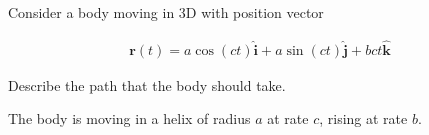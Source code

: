 Consider a body moving in 3D with position vector

\begin{align*}
    \boldsymbol{r}(t) = a\cos(ct) \hat{\boldsymbol{i}} + a \sin(ct) \hat{\boldsymbol{j}} + bct \hat{\boldsymbol{k}}
\end{align*}

Describe the path that the body should take.

\begin{solution}
    The body is moving in a helix of radius $a$ at rate $c$, rising at rate $b$. 
\end{solution}